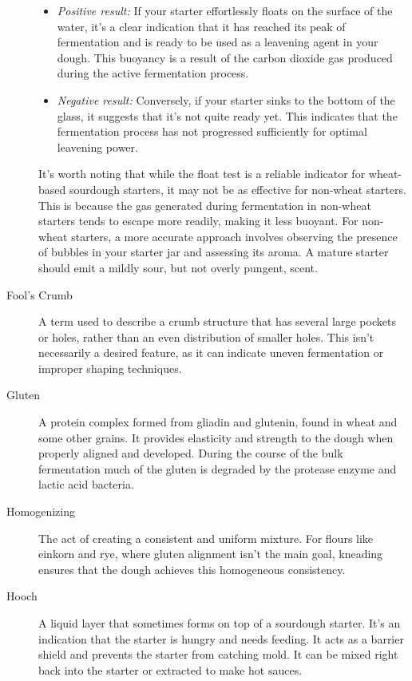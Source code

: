 \begin{description}
\begin{itemize}
\item[] \emph{Positive result:} If your starter effortlessly floats on the
surface of the water, it's a clear indication that it has reached its peak
of fermentation and is ready to be used as a leavening agent in your dough.
This buoyancy is a result of the carbon dioxide gas produced during
the active fermentation process.
\item[] \emph{Negative result:} Conversely, if your starter sinks to the
bottom of the glass, it suggests that it's not quite ready yet.
This indicates that the fermentation process has not progressed
sufficiently for optimal leavening power.
\end{itemize}

It's worth noting that while the float test is a reliable indicator
for wheat-based sourdough starters, it may not be as effective for non-wheat
starters. This is because the gas generated during fermentation in non-wheat
starters tends to escape more readily, making it less buoyant. For non-wheat
starters, a more accurate approach involves observing the presence of
bubbles in your starter jar and assessing its aroma. A mature starter should
emit a mildly sour, but not overly pungent, scent.

\item[Fool’s Crumb] A term used to describe a crumb structure that has several
large pockets or holes, rather than an even distribution of smaller holes. This
isn't necessarily a desired feature, as it can indicate uneven fermentation or
improper shaping techniques.

\item[Gluten] A protein complex formed from gliadin and glutenin, found in wheat
and some other grains. It provides elasticity and strength to the dough when
properly aligned and developed. During the course of the bulk fermentation much of
the gluten is degraded by the protease enzyme and lactic acid bacteria.

\item[Homogenizing] The act of creating a consistent and uniform mixture. For
flours like einkorn and rye, where gluten alignment isn't the main goal, kneading
ensures that the dough achieves this homogeneous consistency.

\item[Hooch] A liquid layer that sometimes forms on top of a sourdough starter.
It's an indication that the starter is hungry and needs feeding. It acts as a
barrier shield and prevents the starter from catching mold. It can be mixed right
back into the starter or extracted to make hot sauces.


\end{description}
